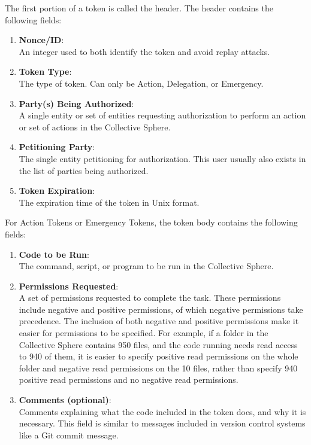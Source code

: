The first portion of a token is called the header. The header contains the
following fields:
\begin{enumerate}
\item \textbf{Nonce/ID}:\\ 
An integer used to both identify the token and avoid replay attacks.
\item \textbf{Token Type}:\\ 
The type of token. Can only be Action, Delegation, or Emergency.
\item \textbf{Party(s) Being Authorized}:\\
A single entity or set of entities requesting authorization to perform an action
or set of actions in the Collective Sphere.
\item \textbf{Petitioning Party}:\\
The single entity petitioning for authorization. This user usually also exists
in the list of parties being authorized.
\item \textbf{Token Expiration}:\\
The expiration time of the token in Unix format.
\end{enumerate}

For Action Tokens or Emergency Tokens, the token body contains the following
fields:
\begin{enumerate}
\item \textbf{Code to be Run}:\\
The command, script, or program to be run in the Collective Sphere.
\item \textbf{Permissions Requested}:\\
A set of permissions requested to complete the task. These permissions include
negative and positive permissions, of which negative permissions take
precedence. The inclusion of both negative and positive permissions make it
easier for permissions to be specified. For example, if a folder in the
Collective Sphere contains 950 files, and the code running needs read access to
940 of them, it is easier to specify positive read permissions on the whole
folder and negative read permissions on the 10 files, rather than specify 940
positive read permissions and no negative read permissions.
\item \textbf{Comments (optional)}:\\
Comments explaining what the code included in the token does, and why it is
necessary. This field is similar to messages included in version control systems
like a Git commit message.
\end{enumerate}

